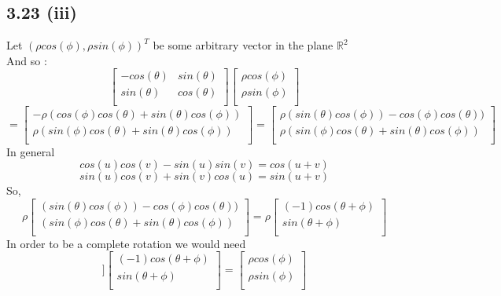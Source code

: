 \documentclass[letterpaper,12pt]{article}
\theoremstyle{definition}
\begin{document}
\subsection*{3.23 (iii)}
Let $(\rho cos(\phi), \rho sin(\phi))^T$ be some arbitrary vector in the plane $\mathbb{R}^2$\\
And so :
\[
 \begin{bmatrix}
  -cos(\theta) & sin(\theta) \\
    sin(\theta) & cos(\theta) \\
 \end{bmatrix}
 \begin{bmatrix}
    \rho cos(\phi) \\
    \rho sin(\phi) \\
 \end{bmatrix} 
\]
 \[= 
  \begin{bmatrix}
    -\rho (cos(\phi)cos(\theta) + sin(\theta)cos(\phi))  \\
    \rho (sin(\phi)cos(\theta) + sin(\theta)cos(\phi)) \\
 \end{bmatrix} = 
 \begin{bmatrix}
    \rho (sin(\theta)cos(\phi)) - cos(\phi)cos(\theta) )   \\
    \rho (sin(\phi)cos(\theta) + sin(\theta)cos(\phi)) \\
 \end{bmatrix}
 \]
 In general\\
 \[cos(u)cos(v) - sin(u)sin(v) = cos(u+v)\]
 \[sin(u)cos(v) + sin(v)cos(u) = sin(u+v)\]
 So,
 \[\rho
 \begin{bmatrix}
    (sin(\theta)cos(\phi)) - cos(\phi)cos(\theta) )   \\
    (sin(\phi)cos(\theta) + sin(\theta)cos(\phi)) \\
 \end{bmatrix} = \rho
 \begin{bmatrix}
    (-1)cos(\theta + \phi)   \\
    sin(\theta + \phi) \\
 \end{bmatrix}
 \]
 In order to be a complete rotation we would need 
 \[]
 \begin{bmatrix}
    (-1)cos(\theta + \phi)   \\
    sin(\theta + \phi) \\
 \end{bmatrix} = 
 \begin{bmatrix}
    \rho cos(\phi) \\
    \rho sin(\phi) \\
 \end{bmatrix}
 \]
\end{document}
